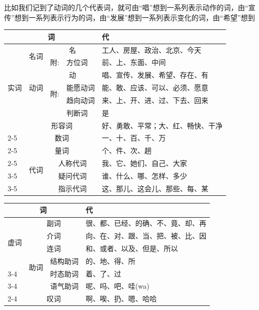 比如我们记到了动词的几个代表词，就可由“唱”想到一系列表示动作的词，由“宣传”想到一系列表示行为的词，由“发展”想到一系列表示变化的词，由“希望”想到
\vspace{1em}

\noindent
\begin{tabular}{|p{2em}|p{2em}|p{1em}|p{4em}|p{12em}|}
    \hline
    \multicolumn{4}{|c|}{词} & 代\\ \hline
    \multirow{7}{*}{实词} & \multirow{2}{*}{名词} & \multicolumn{2}{c|}{名} & 工人、房屋、政治、北京、今天\\ \cline{3-5}
    &      & 附: & 方位词 & 前、上、东面、中间\\ \cline{2-5}
    & \multirow{3}{*}{动词} & \multicolumn{2}{|c|}{动} & 唱、宣传、发展、希望、存在、有\\ \cline{3-5}
    &      & \multirow{2}{*}{附:} & 能愿动词 & 能、敢、应该、可以、必须、愿意\\ \cline{4-5}
    &      &     & 趋向动词 & 来、上、开、进、过、下去、回来\\ \cline{4-5}
    &      &     &判断词 & 是\\ \cline{2-5}
    & \multicolumn{3}{|c|}{形容词} & 好、勇敢、平常；大、红、畅快、干净\\ \cline{2-5}
    & \multicolumn{3}{|c|}{数词} & 一、十、百、千、万\\ \cline{2-5}
    & \multicolumn{3}{|c|}{量词} & 个、件、次、趟\\ \cline{2-5}
    & \multirow{2}{*}{代词} & \multicolumn{2}{|c|}{人称代词} & 我、它、她们、自己、大家\\ \cline{3-5}
    &      & \multicolumn{2}{|c|}{疑问代词} & 谁、什么、哪、怎样、多少\\ \cline{3-5}
    &      & \multicolumn{2}{|c|}{指示代词} & 这、那儿、这会儿、那些、每、某\\
    \hline
\end{tabular}
\newpage

\noindent
\begin{tabular}{|p{2em}|p{3em}|p{4em}|p{13em}|}
    \hline
    \multicolumn{3}{|c|}{词} & 代\\ \hline
    \multirow{4}{*}{虚词} & \multicolumn{2}{|c|}{副词} & 很、都、已经、的确、不、竟、却、再\\ \cline{2-4}
    & \multicolumn{2}{|c|}{介词} & 向、在、对、跟、当、把、被、比、因\\ \cline{2-4}
    & \multicolumn{2}{|c|}{连词} & 和、或者、以及、但是、所以\\ \cline{2-4}
    & \multirow{2}{*}{助词} & 结构助词 & 的、地、得、所\\ \cline{3-4}
    &  & 时态助词 & 着、了、过\\ \cline{3-4}
    &  & 语气助词 & 呢、吗、吧、哇(wa)\\ \cline{2-4}
    & \multicolumn{2}{|c|}{叹词} & 啊、唉、扔、嗯、哈哈\\ \hline
\end{tabular}
\vspace{1em}

